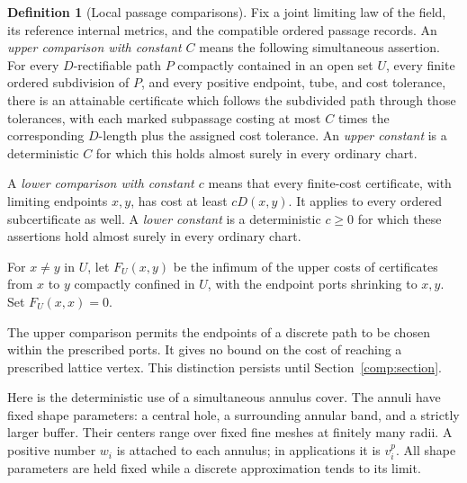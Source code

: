 \documentclass[11pt]{article}
\numberwithin{equation}{section}
\theoremstyle{definition}
\newtheorem{definition}[theorem]{Definition}
\theoremstyle{remark}
\newcommand{\1}{\mathbf 1}
\begin{document}
\begin{definition}[Local passage comparisons]
\label{met:port-comparison}
Fix a joint limiting law of the field, its reference internal metrics,
and the compatible ordered passage records.  An \emph{upper comparison with constant
$C$} means the following simultaneous assertion.  For every
$D$-rectifiable path $P$ compactly contained in an open set $U$, every
finite ordered subdivision of $P$, and every positive endpoint, tube,
and cost tolerance, there is an attainable certificate which follows
the subdivided path through those tolerances, with each marked
subpassage costing at most $C$ times the corresponding $D$-length plus
the assigned cost tolerance.  An \emph{upper constant} is a deterministic
$C$ for which this holds almost surely in every ordinary chart.

A \emph{lower comparison with constant $c$} means that every finite-cost
certificate, with limiting endpoints $x,y$, has cost at least $cD(x,y)$.
It applies to every ordered subcertificate as well.  A \emph{lower
constant} is a deterministic $c\geq0$ for which these assertions hold
almost surely in every ordinary chart.

For $x\ne y$ in $U$, let $F_U(x,y)$ be the infimum of the upper costs of
certificates from $x$ to $y$ compactly confined in $U$, with the endpoint
ports shrinking to $x,y$.  Set $F_U(x,x)=0$.
\end{definition}

The upper comparison permits the endpoints of a discrete path to be
chosen within the prescribed ports.  It gives no bound on the cost of
reaching a prescribed lattice vertex.  This distinction persists until
Section~\ref{comp:section}.

Here is the deterministic use of a simultaneous annulus cover.  The
annuli have fixed shape parameters: a central hole, a surrounding
annular band, and a strictly larger buffer.  Their centers range over
fixed fine meshes at finitely many radii.  A positive number $w_i$ is
attached to each annulus; in applications it is $v_i^p$.  All shape
parameters are held fixed while a discrete approximation tends to its
limit.
\end{document}
